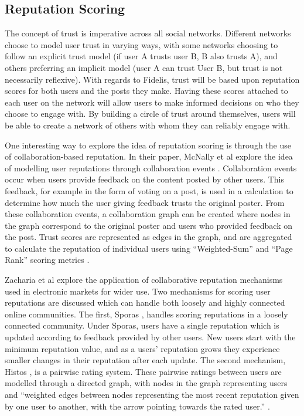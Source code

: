 \subsection{Reputation Scoring}
The concept of trust is imperative across all social networks. Different networks choose to model user trust in varying ways, with some networks choosing to follow an explicit trust model (if user A trusts user B, B also trusts A), and others preferring an implicit model (user A can trust User B, but trust is not necessarily reflexive). With regards to Fidelis, trust will be based upon reputation scores for both users and the posts they make. Having these scores attached to each user on the network will allow users to make informed decisions on who they choose to engage with. By building a circle of trust around themselves, users will be able to create a network of others with whom they can reliably engage with.

One interesting way to explore the idea of reputation scoring is through the use of collaboration-based reputation. In their paper, McNally et al explore the idea of modelling user reputations through collaboration events \cite{mcnally2013}. Collaboration events occur when users provide feedback on the content posted by other users. This feedback, for example in the form of voting on a post, is used in a calculation to determine how much the user giving feedback trusts the original poster. From these collaboration events, a collaboration graph can be created where nodes in the graph correspond to the original poster and users who provided feedback on the post. Trust scores are represented as edges in the graph, and are aggregated to calculate the reputation of individual users using ``Weighted-Sum'' and ``Page Rank'' scoring metrics \cite{mcnally2013}.

Zacharia et al explore the application of collaborative reputation mechanisms used in electronic markets for wider use. Two mechanisms for scoring user reputations are discussed which can handle both loosely and highly connected online communities. The first, Sporas \cite{zacharia2000}, handles scoring reputations in a loosely connected community. Under Sporas, users have a single reputation which is updated according to feedback provided by other users. New users start with the minimum reputation value, and as a users' reputation grows they experience smaller changes in their reputation after each update. The second mechanism, Histos \cite{zacharia2000}, is a pairwise rating system. These pairwise ratings between users are modelled through a directed graph, with nodes in the graph representing users and ``weighted edges between nodes representing the most recent reputation given by one user to another, with the arrow pointing towards the rated user.'' \cite{zacharia2000}.

